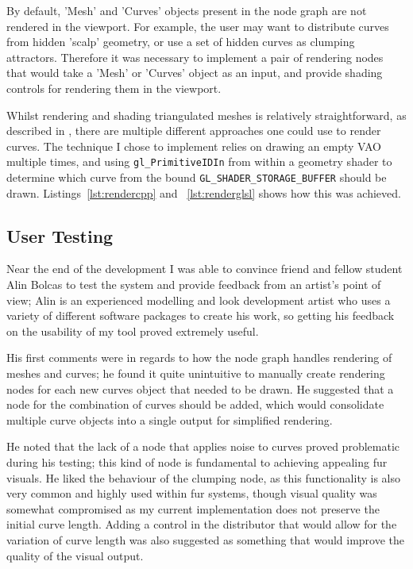 \documentclass[]{acmsiggraph}
\begin{document}
By default, 'Mesh' and 'Curves' objects present in the node graph are not rendered in the viewport. For example, the user may want to distribute curves from hidden 'scalp' geometry, or use a set of hidden curves as clumping attractors. Therefore it was necessary to implement a pair of rendering nodes that would take a 'Mesh' or 'Curves' object as an input, and provide shading controls for rendering them in the viewport.

Whilst rendering and shading triangulated meshes is relatively straightforward, as described in \cite{objLoading}, there are multiple different approaches one could use to render curves. The technique I chose to implement relies on drawing an empty VAO multiple times, and using \texttt{gl\_PrimitiveIDIn} from within a geometry shader to determine which curve from the bound \texttt{GL\_SHADER\_STORAGE\_BUFFER} should be drawn. Listings~\ref{lst:rendercpp} and ~\ref{lst:renderglsl} shows how this was achieved.


\subsection{User Testing} \label{sec:usertesting}
Near the end of the development I was able to convince friend and fellow student Alin Bolcas to test the system and provide feedback from an artist's point of view; Alin is an experienced modelling and look development artist who uses a variety of different software packages to create his work, so getting his feedback on the usability of my tool proved extremely useful.

His first comments were in regards to how the node graph handles rendering of meshes and curves; he found it quite unintuitive to manually create rendering nodes for each new curves object that needed to be drawn. He suggested that a node for the combination of curves should be added, which would consolidate multiple curve objects into a single output for simplified rendering.

He noted that the lack of a node that applies noise to curves proved problematic during his testing; this kind of node is fundamental to achieving appealing fur visuals. He liked the behaviour of the clumping node, as this functionality is also very common and highly used within fur systems, though visual quality was somewhat compromised as my current implementation does not preserve the initial curve length. Adding a control in the distributor that would allow for the variation of curve length was also suggested as something that would improve the quality of the visual output.
\end{document}
